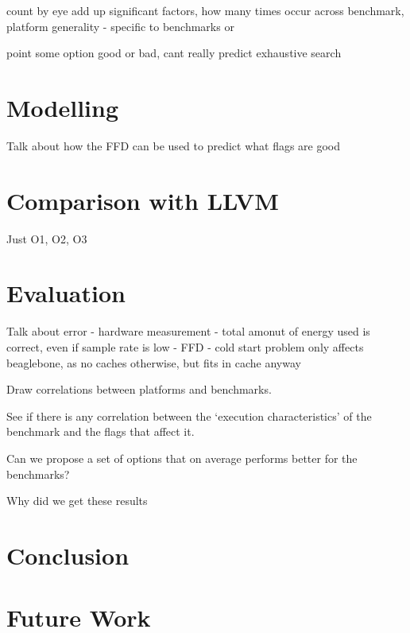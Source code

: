 \documentclass[twocolumn]{article}
\begin{document}

count
by eye add up significant factors, how many times occur across benchmark, platform
generality - specific to benchmarks or

point some option good or bad, cant really predict
exhaustive search

\section*{Modelling}

Talk about how the FFD can be used to predict what flags are good

\section*{Comparison with LLVM}

Just O1, O2, O3


\section*{Evaluation}

Talk about error
 - hardware measurement
 - total amonut of energy used is correct, even if sample rate is low
 - FFD
 - cold start problem
 	only affects beaglebone, as no caches otherwise, but fits in cache anyway


Draw correlations between platforms and benchmarks.

See if there is any correlation between the `execution characteristics' of the benchmark and the flags that affect it.

Can we propose a set of options that on average performs better for the benchmarks?

Why did we get these results


\section*{Conclusion}

\section*{Future Work}

\printbibliography
\end{document}
